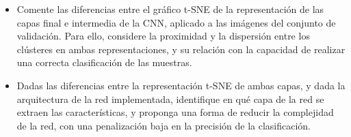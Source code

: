 \documentclass[12pt]{scrartcl}
\begin{document}
\begin{itemize}
    \item Comente las diferencias entre el gráfico t-SNE de la representación de las capas final e intermedia de la CNN, aplicado a las imágenes del conjunto de validación. Para ello, considere la proximidad y la dispersión entre los clústeres en ambas representaciones, y su relación con la capacidad de realizar una correcta clasificación de las muestras.
    \item Dadas las diferencias entre la representación t-SNE de ambas capas, y dada la arquitectura de la red implementada, identifique en qué capa de la red se extraen las características, y proponga una forma de reducir la complejidad de la red, con una penalización baja en la precisión de la clasificación.
    \end{itemize}

    
\end{document}
